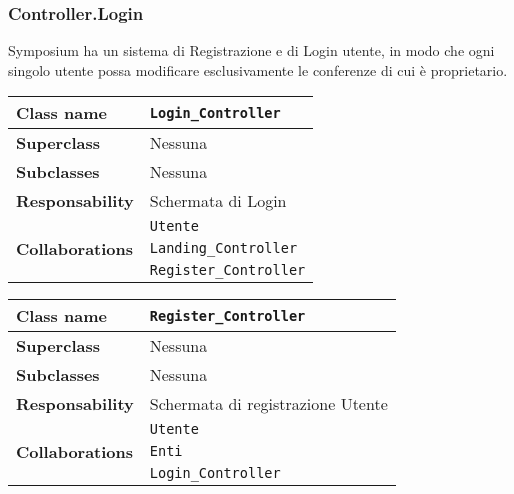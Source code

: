 \subsubsection{Controller.Login}
Symposium ha un sistema di Registrazione e di Login utente, in modo che ogni singolo utente possa modificare esclusivamente le conferenze di cui è proprietario.
\begin{table}[h!]
	\begin{tabular}{|l|l|}
		\hline 
		\textbf{Class name} & \texttt{Login\_Controller}
		\\ \hline
		\textbf{Superclass} & Nessuna
		\\ \hline
		\multirow{1}{*}{\textbf{Subclasses}} & Nessuna
		\\ \hline
		\textbf{Responsability} & Schermata di Login
		\\ \hline
		\multirow{3}{*}{\textbf{Collaborations}} & \texttt{Utente} \\
		& \texttt{Landing\_Controller}\\
		& \texttt{Register\_Controller}
		\\ \hline
	\end{tabular}
\qquad
	\begin{tabular}{|l|l|}
		\hline 
		\textbf{Class name} & \texttt{Register\_Controller}
		\\ \hline
		\textbf{Superclass} & Nessuna
		\\ \hline
		\multirow{1}{*}{\textbf{Subclasses}} & Nessuna
		\\ \hline
		\textbf{Responsability} & Schermata di registrazione Utente
		\\ \hline
		\multirow{3}{*}{\textbf{Collaborations}} & \texttt{Utente} \\
		& \texttt{Enti}\\
		& \texttt{Login\_Controller}
		\\ \hline
	\end{tabular}
\end{table}  


